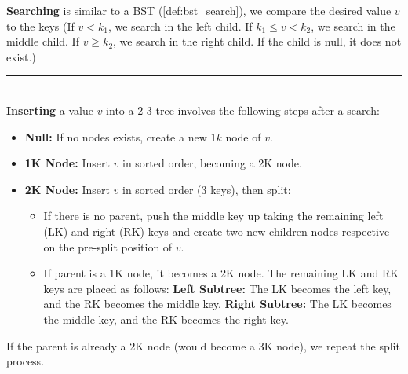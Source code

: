 \begin{Def}

    \label{def:2-3_tree_search_insert}

    \textbf{Searching} is similar to a BST (\ref{def:bst_search}), we compare the desired value $v$ to the keys
    (If $v < k_1$, we search in the left child.
        If $k_1 \leq v < k_2$, we search in the middle child.
        If $v \geq k_2$, we search in the right child.
        If the child is null, it does not exist.)

    \noindent
    \rule{\textwidth}{0.4pt}\\

    \noindent
    \textbf{Inserting} a value $v$ into a 2-3 tree involves the following steps after a search:
    \begin{itemize}
        \item \textbf{Null:} If no nodes exists, create a new $1k$ node of $v$.
        \item \textbf{1K Node:} Insert $v$ in sorted order, becoming a 2K node.
        \item \textbf{2K Node:} Insert $v$ in sorted order (3 keys), then split:
            \begin{itemize}
                \item If there is no parent, push the middle key up taking the remaining left (LK) and right (RK) keys and create two new children nodes respective on the pre-split position of $v$.
                \item If parent is a 1K node, it becomes a 2K node. The remaining LK and RK keys are placed as follows:
                  \textbf{Left Subtree:} The LK becomes the left key, and the RK becomes the middle key.
                        \textbf{Right Subtree:} The LK becomes the middle key, and the RK becomes the right key.
                
            \end{itemize}
    \end{itemize}
    \noindent
    If the parent is already a 2K node (would become a 3K node), we repeat the split process.
\end{Def}

